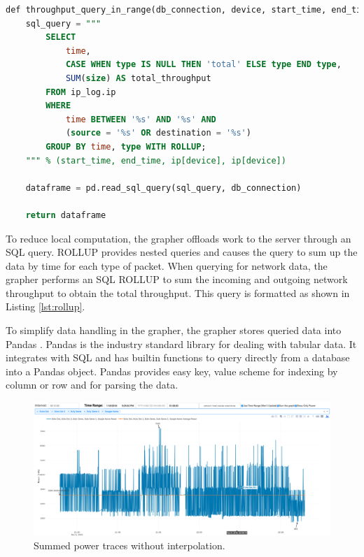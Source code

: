 \noindent
\begin{minipage}{\textwidth}
    \begin{lstlisting}[language=SQL, label={lst:rollup},caption={Efficient SQL query to obtain total Network throughput at each second.}]
    def throughput_query_in_range(db_connection, device, start_time, end_time):
    sql_query = """
        SELECT
            time,
            CASE WHEN type IS NULL THEN 'total' ELSE type END type,
            SUM(size) AS total_throughput
        FROM ip_log.ip
        WHERE
            time BETWEEN '%s' AND '%s' AND
            (source = '%s' OR destination = '%s')
        GROUP BY time, type WITH ROLLUP;
    """ % (start_time, end_time, ip[device], ip[device])

    dataframe = pd.read_sql_query(sql_query, db_connection)

    return dataframe
    \end{lstlisting}
\end{minipage}

To reduce local computation, the grapher offloads work to the server through an SQL query. ROLLUP provides nested queries and causes the query to sum up the data by time for each type of packet. When querying for network data, the grapher performs an SQL ROLLUP to sum the incoming and outgoing network throughput to obtain the total throughput. This query is formatted as shown in Listing \ref{lst:rollup}.

To simplify data handling in the grapher, the grapher stores queried data into Pandas \cite{pandas}. Pandas is the industry standard library for dealing with tabular data. It integrates with SQL and has builtin functions to query directly from a database into a Pandas object. Pandas provides easy key, value scheme for indexing by column or row and for parsing the data.

\begin{figure}[H]
    \centering
    \includegraphics[width=1\textwidth]{figures/noninterpolated.png}
    \caption{Summed power traces without interpolation.}
    \label{fig:noninterpolated}
\end{figure}

